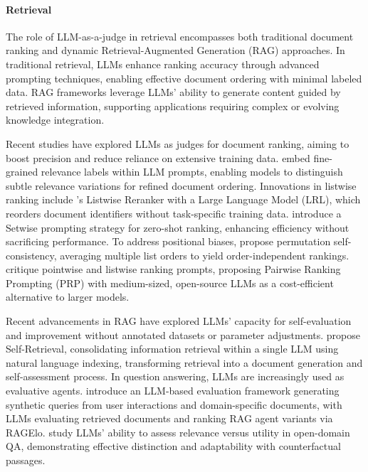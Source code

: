 \documentclass[acmsmall,screen]{acmart}
\begin{document}
\paragraph{\textbf{Retrieval}}
The role of LLM-as-a-judge in retrieval encompasses both traditional document ranking and dynamic Retrieval-Augmented Generation (RAG) approaches. In traditional retrieval, LLMs enhance ranking accuracy through advanced prompting techniques, enabling effective document ordering with minimal labeled data. RAG frameworks leverage LLMs' ability to generate content guided by retrieved information, supporting applications requiring complex or evolving knowledge integration.

Recent studies have explored LLMs as judges for document ranking, aiming to boost precision and reduce reliance on extensive training data. \citet{zhuang2024beyond} embed fine-grained relevance labels within LLM prompts, enabling models to distinguish subtle relevance variations for refined document ordering.
Innovations in listwise ranking include \citet{ma2023zero}'s Listwise Reranker with a Large Language Model (LRL), which reorders document identifiers without task-specific training data. \citet{zhuang2024setwise} introduce a Setwise prompting strategy for zero-shot ranking, enhancing efficiency without sacrificing performance. To address positional biases, \citet{tang2024found} propose permutation self-consistency, averaging multiple list orders to yield order-independent rankings. \citet{naacl_text_ranker} critique pointwise and listwise ranking prompts, proposing Pairwise Ranking Prompting (PRP) with medium-sized, open-source LLMs as a cost-efficient alternative to larger models.

Recent advancements in RAG have explored LLMs' capacity for self-evaluation and improvement without annotated datasets or parameter adjustments. 
\citet{tang2024self} propose Self-Retrieval, consolidating information retrieval within a single LLM using natural language indexing, transforming retrieval into a document generation and self-assessment process. 
In question answering, LLMs are increasingly used as evaluative agents. \citet{rackauckas2024evaluating} introduce an LLM-based evaluation framework generating synthetic queries from user interactions and domain-specific documents, with LLMs evaluating retrieved documents and ranking RAG agent variants via RAGElo. \citet{zhang2024large} study LLMs' ability to assess relevance versus utility in open-domain QA, demonstrating effective distinction and adaptability with counterfactual passages.
\end{document}
